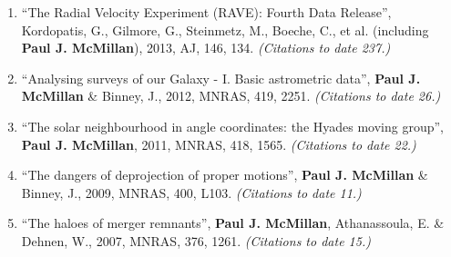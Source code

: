 \documentclass{resume}
\begin{document}
\begin{enumerate}
\item ``The Radial Velocity Experiment (RAVE): Fourth Data Release'', Kordopatis, G., Gilmore, G., Steinmetz, M., Boeche, C., et al. (including \textbf{Paul J. McMillan}), 2013, AJ, 146, 134. \textit{(Citations to date 237.)}

\item ``Analysing surveys of our Galaxy - I. Basic astrometric data'', \textbf{Paul J. McMillan} \& Binney, J., 2012, MNRAS, 419, 2251. \textit{(Citations to date 26.)}

\item ``The solar neighbourhood in angle coordinates: the Hyades moving group'', \textbf{Paul J. McMillan}, 2011, MNRAS, 418, 1565. \textit{(Citations to date 22.)}

\item ``The dangers of deprojection of proper motions'', \textbf{Paul J. McMillan} \& Binney, J., 2009, MNRAS, 400, L103. \textit{(Citations to date 11.)}

\item ``The haloes of merger remnants'', \textbf{Paul J. McMillan}, Athanassoula, E. \& Dehnen, W., 2007, MNRAS, 376, 1261. \textit{(Citations to date 15.)}

\end{enumerate}
\end{document}
